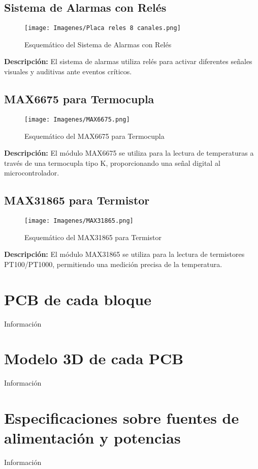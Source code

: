 \subsection{Sistema de Alarmas con Relés}
\begin{figure}[H]
    \centering
    \texttt{[image: Imagenes/Placa reles 8 canales.png]}
    \caption{Esquemático del Sistema de Alarmas con Relés}
    \label{fig:alarmas_reles}
\end{figure}
\textbf{Descripción:} El sistema de alarmas utiliza relés para activar diferentes señales visuales y auditivas ante eventos críticos.

\subsection{MAX6675 para Termocupla}
\begin{figure}[H]
    \centering
    \texttt{[image: Imagenes/MAX6675.png]}
    \caption{Esquemático del MAX6675 para Termocupla}
    \label{fig:max6675}
\end{figure}
\textbf{Descripción:} El módulo MAX6675 se utiliza para la lectura de temperaturas a través de una termocupla tipo K, proporcionando una señal digital al microcontrolador.

\subsection{MAX31865 para Termistor}
\begin{figure}[H]
    \centering
    \texttt{[image: Imagenes/MAX31865.png]}
    \caption{Esquemático del MAX31865 para Termistor}
    \label{fig:max31865}
\end{figure}
\textbf{Descripción:} El módulo MAX31865 se utiliza para la lectura de termistores PT100/PT1000, permitiendo una medición precisa de la temperatura.



\section{PCB de cada bloque}
Información

\section{Modelo 3D de cada PCB}
Información

\section{Especificaciones sobre fuentes de alimentación y potencias}
Información

